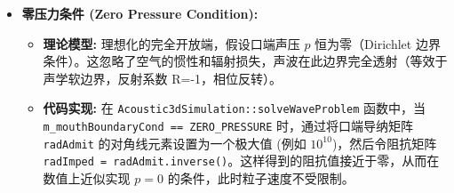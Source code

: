 \documentclass{ctexart}
\begin{document}
\begin{itemize}
\begin{itemize}
        \item \textbf{零压力条件 (Zero Pressure Condition):}
            \begin{itemize}
                \item \textbf{理论模型:} 理想化的完全开放端，假设口端声压 $p$ 恒为零（Dirichlet 边界条件）。这忽略了空气的惯性和辐射损失，声波在此边界完全透射（等效于声学软边界，反射系数 R=-1，相位反转）。
                \item \textbf{代码实现:} 在 \texttt{Acoustic3dSimulation::solveWaveProblem} 函数中，当 \texttt{m\_mouthBoundaryCond == ZERO\_PRESSURE} 时，通过将口端导纳矩阵 \texttt{radAdmit} 的对角线元素设置为一个极大值 (例如 $10^{10}$)，然后令阻抗矩阵 \texttt{radImped = radAdmit.inverse()}。这样得到的阻抗值接近于零，从而在数值上近似实现 $p=0$ 的条件，此时粒子速度不受限制。
            \end{itemize}


\end{itemize}
\end{itemize}
\end{document}
